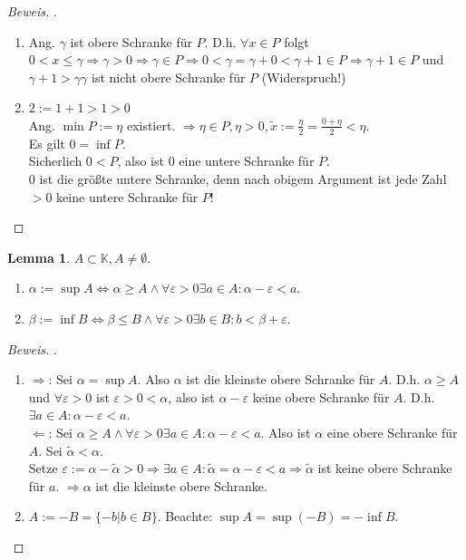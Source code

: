 \documentclass[12pt,a4paper,titlepage]{article} %
\theoremstyle{definition}
\newtheorem{lem}[satz]{Lemma}
\theoremstyle{remark}
\newenvironment{bew}{\begin{proof}[Beweis]}{\end{proof}}
\begin{document}
\begin{bew} . %
	\begin{enumerate}
		\item Ang. $\gamma$ ist obere Schranke für $P$. D.h. $\forall x\in P$ folgt $0<x\leq\gamma\Rightarrow\gamma >0\Rightarrow \gamma \in P \Rightarrow 0 < \gamma = \gamma + 0 < \gamma + 1 \in P\Rightarrow\gamma + 1\in P$ und $\gamma +1>\gamma \gamma$ ist nicht obere Schranke für $P$ (Widerspruch!) \Lightning
		\item $2:= 1+1 > 1>0$\\
		Ang. $\min P := \eta$ existiert. $\Rightarrow \eta \in P, \eta > 0, \tilde{x} := \frac{\eta}{2} = \frac{0 + \eta}{2} < \eta$.\\
		Es gilt $0 = \inf P$.\\
		Sicherlich $0<P$, also ist $0$ eine untere Schranke für $P$.\\
		$0$ ist die größte untere Schranke, denn nach obigem Argument ist jede Zahl $>0$ keine untere Schranke für $P$!
	\end{enumerate}
\end{bew}
\begin{lem}
	$A\subset\mathbb{K}, A\neq \emptyset$.
	\begin{enumerate}
		\item $\alpha := \sup A \Leftrightarrow \alpha \geq A \wedge \forall \varepsilon > 0 \exists a \in A: \alpha - \varepsilon < a$.
		\item $\beta := \inf B \Leftrightarrow \beta \leq B \wedge \forall \varepsilon > 0 \exists b \in B: b < \beta + \varepsilon$.
	\end{enumerate}
\end{lem}
\begin{bew} .%
	\begin{enumerate}
		\item \glqq $\Rightarrow$\grqq: Sei $\alpha = \sup A$. Also $\alpha$ ist die kleinste obere Schranke für $A$. D.h. $\alpha \geq A$ und $\forall \varepsilon > 0$ ist $\varepsilon>0<\alpha$, also ist $\alpha-\varepsilon$ keine obere Schranke für $A$. D.h. $\exists a\in A:\alpha - \varepsilon <a$.\\
		\glqq $\Leftarrow$\grqq: Sei $\alpha \geq A \wedge \forall \varepsilon > 0 \exists a \in A: \alpha - \varepsilon < a$. Also ist $\alpha$ eine obere Schranke für $A$. Sei $\tilde{\alpha}<\alpha$.\\
		Setze $\varepsilon:= \alpha -\tilde{\alpha} > 0 \Rightarrow \exists a \in A: \tilde{\alpha} = \alpha - \varepsilon < a \Rightarrow \tilde{\alpha}$ ist keine obere Schranke für $a$. $\Rightarrow\alpha$ ist die kleinste obere Schranke.
		\item $A:= -B = \{-b|b \in B\}$. Beachte: $\sup A = \sup(-B) = -\inf B$.
	\end{enumerate}
\end{bew}
\end{document}
